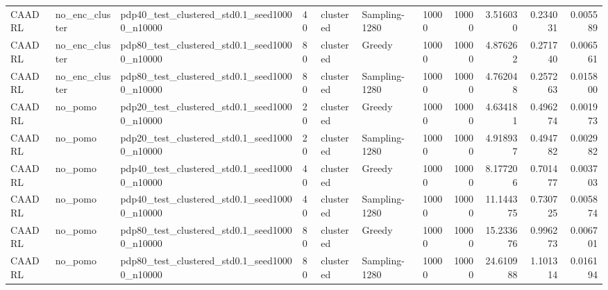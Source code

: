 \begin{tabular}{lllllllrrrr}
CAADRL & no_enc_cluster & pdp40_test_clustered_std0.1_seed10000_n10000 & 40 & clustered & Sampling-1280 & 10000 & 10000 & 3.516030 & 0.234031 & 0.005589 \\
CAADRL & no_enc_cluster & pdp80_test_clustered_std0.1_seed10000_n10000 & 80 & clustered & Greedy & 10000 & 10000 & 4.876262 & 0.271740 & 0.006561 \\
CAADRL & no_enc_cluster & pdp80_test_clustered_std0.1_seed10000_n10000 & 80 & clustered & Sampling-1280 & 10000 & 10000 & 4.762048 & 0.257263 & 0.015800 \\
CAADRL & no_pomo & pdp20_test_clustered_std0.1_seed10000_n10000 & 20 & clustered & Greedy & 10000 & 10000 & 4.634181 & 0.496274 & 0.001973 \\
CAADRL & no_pomo & pdp20_test_clustered_std0.1_seed10000_n10000 & 20 & clustered & Sampling-1280 & 10000 & 10000 & 4.918937 & 0.494782 & 0.002982 \\
CAADRL & no_pomo & pdp40_test_clustered_std0.1_seed10000_n10000 & 40 & clustered & Greedy & 10000 & 10000 & 8.177206 & 0.701477 & 0.003703 \\
CAADRL & no_pomo & pdp40_test_clustered_std0.1_seed10000_n10000 & 40 & clustered & Sampling-1280 & 10000 & 10000 & 11.144375 & 0.730725 & 0.005874 \\
CAADRL & no_pomo & pdp80_test_clustered_std0.1_seed10000_n10000 & 80 & clustered & Greedy & 10000 & 10000 & 15.233676 & 0.996273 & 0.006701 \\
CAADRL & no_pomo & pdp80_test_clustered_std0.1_seed10000_n10000 & 80 & clustered & Sampling-1280 & 10000 & 10000 & 24.610988 & 1.101314 & 0.016194 \\
\bottomrule
\end{tabular}
